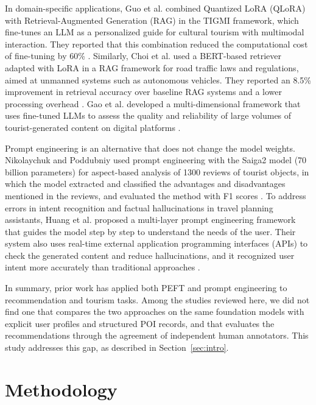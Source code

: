 \documentclass[journal,article,submit,pdftex,moreauthors]{Definitions/mdpi}
\begin{document}
In domain-specific applications, Guo et al. combined Quantized LoRA (QLoRA) with Retrieval-Augmented Generation (RAG) in the TIGMI framework, which fine-tunes an LLM as a personalized guide for cultural tourism with multimodal interaction. They reported that this combination reduced the computational cost of fine-tuning by 60\% \citep{guo2025interactive}. Similarly, Choi et al. used a BERT-based retriever adapted with LoRA in a RAG framework for road traffic laws and regulations, aimed at unmanned systems such as autonomous vehicles. They reported an 8.5\% improvement in retrieval accuracy over baseline RAG systems and a lower processing overhead \citep{choi2025enhanced}. Gao et al. developed a multi-dimensional framework that uses fine-tuned LLMs to assess the quality and reliability of large volumes of tourist-generated content on digital platforms \citep{gao2025quality}.

Prompt engineering is an alternative that does not change the model weights. Nikolaychuk and Poddubniy used prompt engineering with the Saiga2 model (70 billion parameters) for aspect-based analysis of 1300 reviews of tourist objects, in which the model extracted and classified the advantages and disadvantages mentioned in the reviews, and evaluated the method with F1 scores \citep{nikolaychuk2024analysis}. To address errors in intent recognition and factual hallucinations in travel planning assistants, Huang et al. proposed a multi-layer prompt engineering framework that guides the model step by step to understand the needs of the user. Their system also uses real-time external application programming interfaces (APIs) to check the generated content and reduce hallucinations, and it recognized user intent more accurately than traditional approaches \citep{huang2025multi}.

In summary, prior work has applied both PEFT and prompt engineering to recommendation and tourism tasks. Among the studies reviewed here, we did not find one that compares the two approaches on the same foundation models with explicit user profiles and structured POI records, and that evaluates the recommendations through the agreement of independent human annotators. This study addresses this gap, as described in Section~\ref{sec:intro}.

\section{Methodology}\label{sec:methods}
\end{document}
